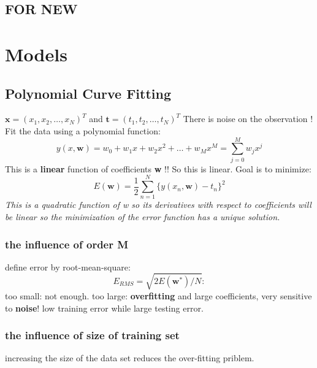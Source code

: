 \documentclass[a4paper]{book}
\begin{document}
\section{FOR NEW}

\chapter{Models}
\section{Polynomial Curve Fitting}
$\textbf{x} = (x_1,x_2,\dots, x_N)^T $ and $\textbf{t} =(t_1,t_2, \dots, t_N)^T$
There is noise on the observation !\newline
Fit the data using a polynomial function:
$$y(x, \textbf{w}) = w_0+w_1x+w_2x^2+\dots+w_Mx^M=\sum_{j=0}^Mw_jx^j$$
This is a \textbf{linear} function of coefficients \textbf{w}  !! So this is linear.\newline
Goal is to minimize:
$$E(\textbf{w}) = \frac12\sum_{n=1}^N\{y(x_n,\textbf{w})-t_n\}^2$$
\emph{This is a quadratic function of w so its derivatives with respect to coefficients will be linear so the minimization of the error function has a unique solution.}
\subsection{the influence of order M}
define error by root-mean-square:
\begin{equation}\label{2.3}
E_{RMS} = \sqrt{2E(\textbf{w}^*)/N}:
\end{equation}
too small: not enough.\newline
too large: \textbf{overfitting} and large coefficients, very sensitive to \textbf{noise}! low training error while large testing error.
\subsection{the influence of size of training set}
increasing the size of the data set reduces the over-fitting priblem.\newline
{}
\end{document}
